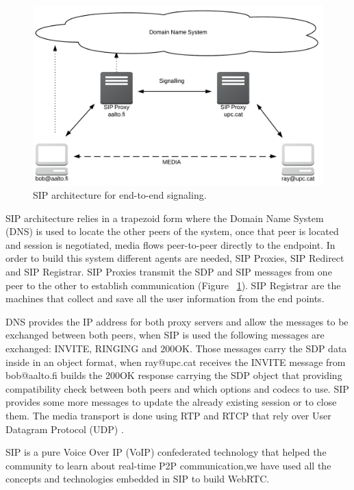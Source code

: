 \begin{figure}[h]
  \centering
    \includegraphics[width=1\textwidth]{./figures/SIParchitecture.png}
      \caption[SIP architecture for end-to-end signaling]{SIP architecture for end-to-end signaling.}
	\label{fig:SIParchitecture}
\end{figure}

SIP architecture relies in a trapezoid form where the Domain Name System (DNS) is used to locate the other peers of the system, once that peer is located and session is negotiated, media flows peer-to-peer directly to the endpoint. In order to build this system different agents are needed, SIP Proxies, SIP Redirect and SIP Registrar. SIP Proxies transmit the SDP and SIP messages from one peer to the other to establish communication (Figure ~\ref{fig:SIParchitecture}). SIP Registrar are the machines that collect and save all the user information from the end points.

DNS provides the IP address for both proxy servers and allow the messages to be exchanged between both peers, when SIP is used the following messages are exchanged: INVITE, RINGING and 200OK. Those messages carry the SDP data inside in an object format, when ray@upc.cat receives the INVITE message from bob@aalto.fi builds the 200OK response carrying the SDP object that providing compatibility check between both peers and which options and codecs to use. SIP provides some more messages to update the already existing session or to close them. The media transport is done using RTP and RTCP that rely over User Datagram Protocol (UDP) \cite{sipRFC}.

SIP is a pure Voice Over IP (VoIP) confederated technology that helped the community to learn about real-time P2P communication,we have used all the concepts and technologies embedded in SIP to build WebRTC.


